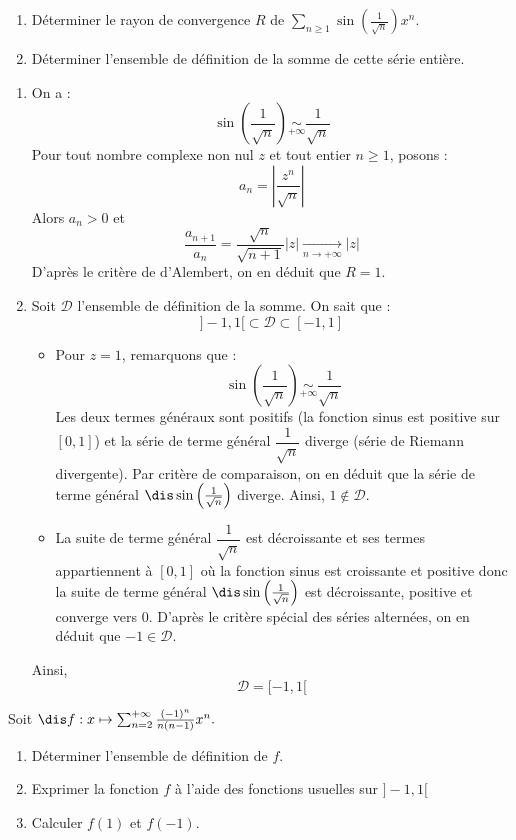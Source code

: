 \documentclass[a4paper,10pt]{report}
\newcommand{\Sum}[2]{\ensuremath{\textstyle{\sum\limits_{#1}^{#2}}}}
\begin{document}
\begin{Exercice}{} \begin{enumerate}
\item Déterminer le rayon de convergence $R$ de $\Sum{n \geq 1}{} \sin \left( \frac{1}{\sqrt{n}} \right) x^n$.
\item Déterminer l'ensemble de définition de la somme de cette série entière.
\end{enumerate}
\end{Exercice}

\corr 

\begin{enumerate}
\item On a :
$$ \sin \left( \frac{1}{\sqrt{n}} \right) \underset{+ \infty}{\sim} \dfrac{1}{\sqrt{n}}$$
Pour tout nombre complexe non nul $z$ et tout entier $n \geq 1$, posons :
$$  a_n = \left\vert \dfrac{z^n}{ \sqrt{n}} \right\vert$$
Alors $a_n>0$ et 
$$ \dfrac{a_{n+1}}{a_n} = \dfrac{\sqrt{n}}{\sqrt{n+1}} \vert z \vert \underset{ n \rightarrow+ \infty}{\longrightarrow} \vert z \vert$$
D'après le critère de d'Alembert, on en déduit que $R=1$.
\item Soit $\mathcal{D}$ l'ensemble de définition de la somme. On sait que : 
$$ ]-1,1[ \subset \mathcal{D} \subset [-1,1]$$
\begin{itemize}
\item Pour $z=1$, remarquons que :
$$ \sin \left( \frac{1}{\sqrt{n}} \right) \underset{+ \infty}{\sim} \dfrac{1}{\sqrt{n}} $$
Les deux termes généraux sont positifs (la fonction sinus est positive sur $[0,1]$) et la série de terme général $\dfrac{1}{\sqrt{n}}$ diverge (série de Riemann divergente). Par critère de comparaison, on en déduit que la série de terme général $\dis \sin \left( \frac{1}{\sqrt{n}} \right)$ diverge. Ainsi, $1 \notin \mathcal{D}$.
\item La suite de terme général $\dfrac{1}{\sqrt{n}}$ est décroissante et ses termes appartiennent à $[0,1]$ où la fonction sinus est croissante et positive donc la suite de terme général $\dis \sin \left( \frac{1}{\sqrt{n}} \right)$ est décroissante, positive et converge vers $0$. D'après le critère spécial des séries alternées, on en déduit que $-1 \in \mathcal{D}$.
\end{itemize}
Ainsi,
$$ \mathcal{D}= [-1,1[$$
\end{enumerate}

\begin{Exercice}{} Soit $\dis f : x \mapsto \sum_{n = 2}^{ + \infty} \frac{( - 1)^{n}}{n(n - 1)}x^{n}.$

  \begin{enumerate}
  \item
    Déterminer l'ensemble de définition de $f$.
  \item
    Exprimer la fonction $f$ à l'aide des fonctions usuelles sur $] - 1,1[$
  \item Calculer $f(1)$ et $f( - 1)$.
  \end{enumerate}
  \end{Exercice} 
  
\end{document}
